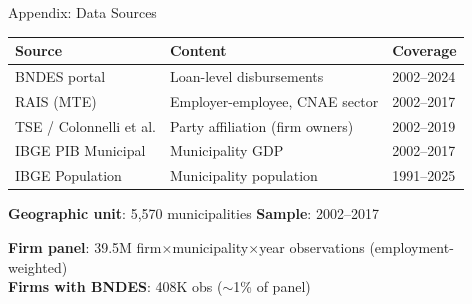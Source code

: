 \documentclass[aspectratio=169,11pt]{beamer}
\begin{document}
\begin{frame}{Appendix: Data Sources}

\begin{center}
\footnotesize
\begin{tabular}{lll}
\toprule
\textbf{Source} & \textbf{Content} & \textbf{Coverage} \\
\midrule
BNDES portal & Loan-level disbursements & 2002--2024 \\
RAIS (MTE) & Employer-employee, CNAE sector & 2002--2017 \\
TSE / Colonnelli et al. & Party affiliation (firm owners) & 2002--2019 \\
IBGE PIB Municipal & Municipality GDP & 2002--2017 \\
IBGE Population & Municipality population & 1991--2025 \\
\bottomrule
\end{tabular}
\end{center}

\bigskip

\textbf{Geographic unit}: 5,570 municipalities \quad\textbf{Sample}: 2002--2017

\medskip

\textbf{Firm panel}: 39.5M firm$\times$municipality$\times$year observations (employment-weighted)\\
\textbf{Firms with BNDES}: 408K obs ($\sim$1\% of panel)

\end{frame}
\end{document}
